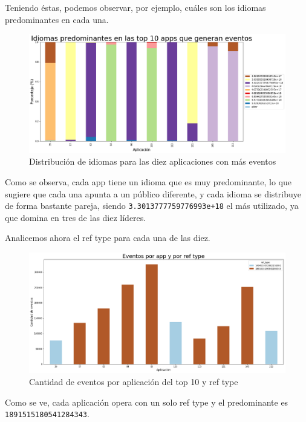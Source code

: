 \documentclass[a4paper, 12pt]{article}
\begin{document}
		Teniendo éstas, podemos observar, por ejemplo, cuáles son los idiomas predominantes en cada una.
		
		\FloatBarrier
		\begin{figure}[h]
			\centering
			\includegraphics[width=\textwidth]{images/events/idiomasapps.png}
			\caption{Distribución de idiomas para las diez aplicaciones con más eventos}
		\end{figure}
		\FloatBarrier
		
		Como se observa, cada app tiene un idioma que es muy predominante, lo que sugiere que cada una apunta a un público diferente, y cada idioma se distribuye de forma bastante pareja, siendo \texttt{3.3013777759776993e+18} el más utilizado, ya que domina en tres de las diez líderes.
		
		Analicemos ahora el ref type para cada una de las diez.
		
		\FloatBarrier
		\begin{figure}[h]
			\centering
			\includegraphics[width=\textwidth]{images/events/evxrf.png}
			\caption{Cantidad de eventos por aplicación del top 10 y ref type}
		\end{figure}
		\FloatBarrier
		
		Como se ve, cada aplicación opera con un solo ref type y el predominante es \texttt{1891515180541284343}.
		
\end{document}
